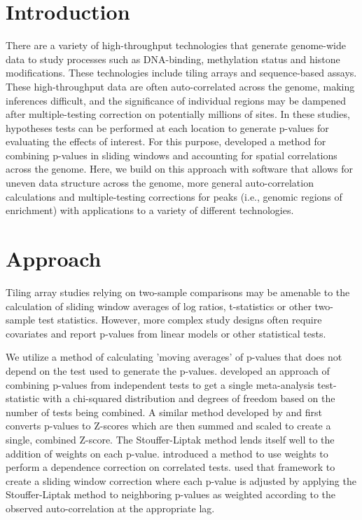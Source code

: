 \documentclass{bioinfo}
\begin{document}
\section{Introduction}
There are a variety of high-throughput technologies that generate
genome-wide data to study processes such as DNA-binding, methylation
status and histone modifications. These technologies include tiling
arrays and sequence-based assays. These high-throughput data
are often auto-correlated across
the genome, making inferences difficult, and the significance of
individual regions may be dampened after multiple-testing correction
on potentially millions of sites.
In these studies, hypotheses tests can be performed at each location to
generate p-values for evaluating the effects of interest. For this
purpose, \cite{Kechris2010} developed a method for combining p-values
in sliding windows and accounting for spatial correlations across the
genome. Here, we build on this approach with software
that allows for uneven data structure across the genome, more general
auto-correlation calculations and multiple-testing corrections for peaks
(i.e., genomic regions of enrichment) with applications to a variety of
different technologies.

\section{Approach}
Tiling array studies relying on two-sample comparisons may be
amenable to the calculation of sliding window averages of log ratios,
t-statistics or other two-sample test statistics. However,
more complex study designs often require covariates and report
p-values from linear models or other statistical tests.

We utilize a method of calculating 'moving averages' of p-values that
does not depend on the test used to generate the p-values. \cite{Fisher}
developed an approach of combining p-values from independent tests to
get a single meta-analysis test-statistic with a chi-squared
distribution and degrees of freedom based on the number of tests being
combined.  A similar method developed by \cite{Stouffer} and
\cite{Liptak} first converts p-values to Z-scores which are then summed
and scaled to create a single, combined Z-score.  The Stouffer-Liptak
method lends itself well to the addition of weights on each p-value.
\cite{Zaykin2002} introduced a method to use weights to perform a
dependence correction on correlated tests. \cite{Kechris2010} used that
framework to create a sliding window correction where each p-value is
adjusted by applying the Stouffer-Liptak method to neighboring p-values
as weighted according to the observed auto-correlation at the
appropriate lag.
\end{document}

